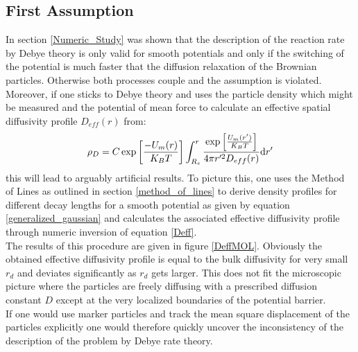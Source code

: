 \subsection{First Assumption}
In section \ref{Numeric_Study} was shown that the description of the reaction rate by Debye theory is only valid for smooth potentials and only if the switching of the potential is much faster that the diffusion relaxation of the Brownian particles. Otherwise both processes couple and the assumption is violated. Moreover, if one sticks to Debye theory and uses the particle density which might be measured and the potential of mean force to calculate an effective spatial diffusivity profile $D_{eff}(r)$ from: 
\begin{equation}
    \rho_D = C \exp\left[\frac{-U_m(r)}{K_B T}\right] \int_{R_s}^{r} \frac{\exp\left[\frac{U_m(r')}{K_B T}\right]}{4 \pi r'^{2} D_{eff}(r)}{\rm d} r'
    \label{Deff}
\end{equation}
this will lead to arguably artificial results. To picture this, one uses the Method of Lines as outlined in section \ref{method_of_lines} to derive density profiles for different decay lengths for a smooth potential as given by equation \eqref{generalized_gaussian} and calculates the associated effective diffusivity profile through numeric inversion of equation \eqref{Deff}. \\
The results of this procedure are given in figure \ref{DeffMOL}. Obviously the obtained effective diffusivity profile is equal to the bulk diffusivity for very small $r_d$ and deviates significantly as $r_d$ gets larger. This does not fit the microscopic picture where the particles are freely diffusing with a prescribed diffusion constant $D$ except at the very localized boundaries of the potential barrier. \\
If one would use marker particles and track the mean square displacement of the particles explicitly one would therefore quickly uncover the inconsistency of the description of the problem by Debye rate theory.\\
